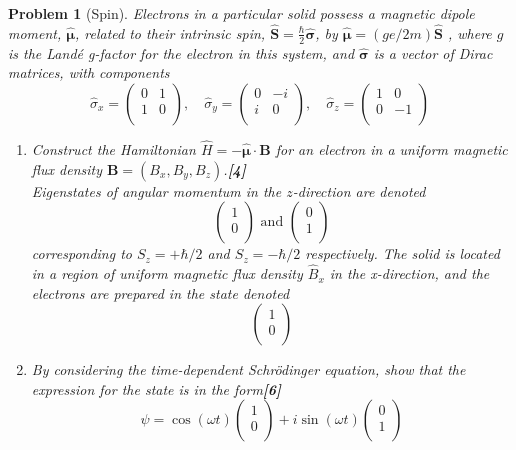 \documentclass[a4paper]{article}
\theoremstyle{new}
\newtheorem{qns}{Problem}[subsection]
\begin{document}
\begin{qns}[Spin]
Electrons in a particular solid possess a magnetic dipole moment, $\hat{\boldsymbol{\mu}}$, related to their intrinsic spin, $\hat{\mathbf{S}}=\frac{\hbar}{2}\hat{\boldsymbol{\sigma}}$, by $\hat{\boldsymbol{\mu}}=(ge/2m)\hat{\mathbf{S}}$ , where $g$ is the Landé g-factor for the electron in this system, and $\hat{\boldsymbol{\sigma}}$ is a vector of Dirac matrices, with components
$$\hat{\sigma}_x=\begin{pmatrix}0&1\\1&0\\\end{pmatrix},\quad\hat{\sigma}_y=\begin{pmatrix}0&-i\\i&0\\\end{pmatrix},\quad\hat{\sigma}_z=\begin{pmatrix}1&0\\0&-1\\\end{pmatrix}$$
\begin{enumerate}[label=(\roman*)]
\item Construct the Hamiltonian $\hat{H}=-\hat{\boldsymbol{\mu}}\cdot\mathbf{B}$ for an electron in a uniform magnetic flux density $\mathbf{B} = (B_x, B_y, B_z)$.\hfill\textbf{[4]}\\[5pt]
Eigenstates of angular momentum in the $z$-direction are denoted
$$\begin{pmatrix}1\\0\\\end{pmatrix}\text{   and   }\begin{pmatrix}0\\1\\\end{pmatrix}$$
corresponding to $S_z =+\hbar/2$ and $S_z=-\hbar/2$ respectively. The solid is located in a region of uniform magnetic flux density $\hat{B}_x$ in the x-direction, and the electrons are prepared in the state denoted  
$$\begin{pmatrix}1\\0\\\end{pmatrix}$$
\item By considering the time-dependent Schrödinger equation, show that the expression for the state is in the form\hfill\textbf{[6]}
$$\psi=\cos(\omega t)\begin{pmatrix}1\\0\\\end{pmatrix}+i\sin(\omega t)\begin{pmatrix}0\\1\\\end{pmatrix}$$

\end{enumerate}
\end{qns}
\end{document}
